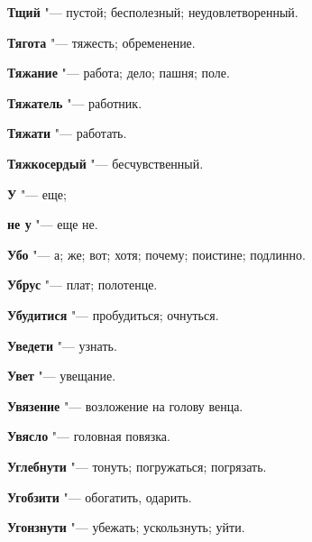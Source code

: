 \begin{mymulticols}{2}
\noindent\textbf{Тщий} "--- пустой; бесполезный; неудовлетворенный. 




\noindent\textbf{Тягота} "--- тяжесть; обременение. 




\noindent\textbf{Тяжание} "--- работа; дело; пашня; поле. 




\noindent\textbf{Тяжатель} "--- работник. 




\noindent\textbf{Тяжати} "--- работать. 




\noindent\textbf{Тяжкосердый} "--- бесчувственный. 




\bukvaending






\noindent\textbf{У} "--- еще; 




\noindent\textbf{не у} "--- еще не. 




\noindent\textbf{Убо} "--- а; же; вот; хотя; почему; поистине; подлинно. 




\noindent\textbf{Убрус} "--- плат; полотенце. 




\noindent\textbf{Убудитися} "--- пробудиться; очнуться. 




\noindent\textbf{Уведети} "--- узнать. 




\noindent\textbf{Увет} "--- увещание. 




\noindent\textbf{Увязение} "--- возложение на голову венца. 




\noindent\textbf{Увясло} "--- головная повязка. 




\noindent\textbf{Углебнути} "--- тонуть; погружаться; погрязать. 




\noindent\textbf{Угобзити} "--- обогатить, одарить. 




\noindent\textbf{Угонзнути} "--- убежать; ускользнуть; уйти. 





\end{mymulticols}
